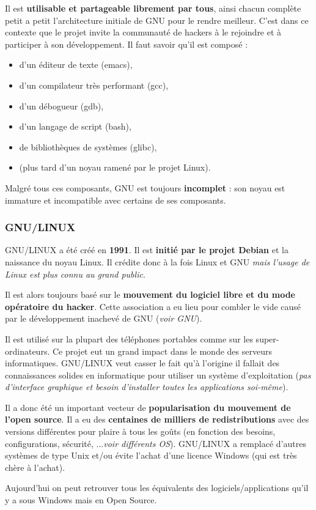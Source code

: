 Il est \textbf{utilisable et partageable librement par tous}, ainsi chacun
complète petit a petit l'architecture initiale de GNU pour le rendre meilleur.
C'est dans ce contexte que le projet invite la communauté de hackers à le
rejoindre et à participer à son développement.
Il faut savoir qu'il est composé :
\begin{itemize}
	\item d'un éditeur de texte (emacs),
	\item d'un compilateur très performant (gcc),
	\item d'un débogueur (gdb),
	\item d'un langage de script (bash),
	\item de bibliothèques de systèmes (glibc),
	\item (plus tard d'un noyau ramené par le projet Linux).
\end{itemize}
Malgré tous ces composants, GNU est toujours \textbf{incomplet} : son noyau est immature et incompatible avec certains de ses composants. \newline


\subsubsection{GNU/LINUX}

GNU/LINUX a été créé en \textbf{1991}. Il est \textbf{initié par le projet
Debian} et la naissance du noyau Linux.
Il crédite donc à la fois Linux et GNU \textit{mais l'usage de Linux est plus
connu au grand public}.

Il est alors toujours basé sur le \textbf{mouvement du logiciel libre et du mode
opératoire du hacker}.
Cette association a eu lieu pour combler le vide causé par le développement
inachevé de GNU (\textit{voir GNU}).\newline

Il est utilisé sur la plupart des téléphones portables comme sur les
super-ordinateurs. Ce projet eut un grand impact dans le monde des serveurs
informatiques.
GNU/LINUX veut casser le fait qu'à l'origine il fallait des connaissances
solides en informatique pour utiliser un système d'exploitation (\textit{pas
d'interface graphique et besoin d'installer toutes les applications soi-même}).

Il a donc été un important vecteur de \textbf{popularisation du mouvement de
l'open source}.
Il a eu des \textbf{centaines de milliers de redistributions} avec des versions
différentes pour plaire à tous les goûts (en fonction des besoins,
configurations, sécurité, ...\textit{voir différents OS}).
GNU/LINUX a remplacé d'autres systèmes de type Unix et/ou évite l'achat d'une
licence Windows (qui est très chère à l'achat).\newline

Aujourd'hui on peut retrouver tous les équivalents des logiciels/applications
qu'il y a sous Windows mais en Open Source.\newline
